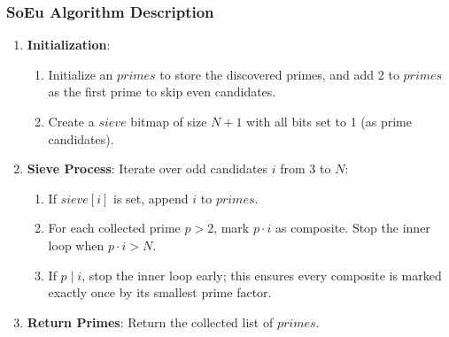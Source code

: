 \documentclass{article}
\begin{document}
\subsubsection*{SoEu Algorithm Description}
\begin{enumerate}[noitemsep]
    \item \textbf{Initialization}: 
    \begin{enumerate}
        \item Initialize an  $primes$ to store the discovered primes, and add 2 to $primes$ as the first prime to skip even candidates.
        \item Create a $sieve$ bitmap of size $N+1$ with all bits set to 1 (as prime candidates).
    \end{enumerate}
    \item \textbf{Sieve Process}: Iterate over odd candidates $i$ from 3 to $N$:
    \begin{enumerate}
        \item If $sieve[i]$ is set, append $i$ to $primes$.
        \item For each collected prime $p>2$, mark $p\cdot i$ as composite. Stop the inner loop when $p\cdot i > N$.
        \item If $p \mid i$, stop the inner loop early; this ensures every composite is marked exactly once by its smallest prime factor.
    \end{enumerate}
    \item \textbf{Return Primes}: Return the collected list of $primes$.
\end{enumerate}
\end{document}
